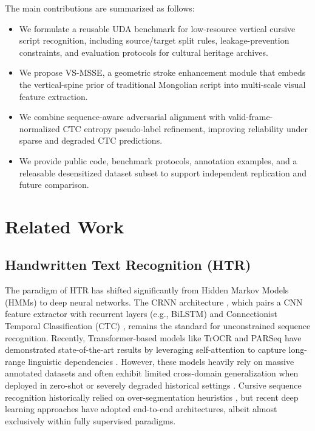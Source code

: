 \documentclass[pdflatex,sn-mathphys-num]{sn-jnl}
\begin{document}
The main contributions are summarized as follows:
\begin{itemize}[noitemsep,topsep=0pt]
    \item We formulate a reusable UDA benchmark for low-resource vertical cursive script recognition, including source/target split rules, leakage-prevention constraints, and evaluation protocols for cultural heritage archives.
    \item We propose VS-MSSE, a geometric stroke enhancement module that embeds the vertical-spine prior of traditional Mongolian script into multi-scale visual feature extraction.
    \item We combine sequence-aware adversarial alignment with valid-frame-normalized CTC entropy pseudo-label refinement, improving reliability under sparse and degraded CTC predictions.
    \item We provide public code, benchmark protocols, annotation examples, and a releasable desensitized dataset subset to support independent replication and future comparison.
\end{itemize}

\section{Related Work}

\subsection{Handwritten Text Recognition (HTR)}
The paradigm of HTR has shifted significantly from Hidden Markov Models (HMMs) \cite{marti2001using} to deep neural networks. The CRNN architecture \cite{shi2016end}, which pairs a CNN feature extractor with recurrent layers (e.g., BiLSTM) and Connectionist Temporal Classification (CTC) \cite{graves2006connectionist}, remains the standard for unconstrained sequence recognition. Recently, Transformer-based models like TrOCR \cite{li2021trocr} and PARSeq \cite{bautista2022parseq} have demonstrated state-of-the-art results by leveraging self-attention to capture long-range linguistic dependencies \cite{kang2022pay, souibgui2022few}. However, these models heavily rely on massive annotated datasets and often exhibit limited cross-domain generalization when deployed in zero-shot or severely degraded historical settings \cite{coquenet2023dan}. Cursive sequence recognition historically relied on over-segmentation heuristics \cite{marti2001using}, but recent deep learning approaches \cite{shi2018aster, bhunia2021meta} have adopted end-to-end architectures, albeit almost exclusively within fully supervised paradigms.
\end{document}
